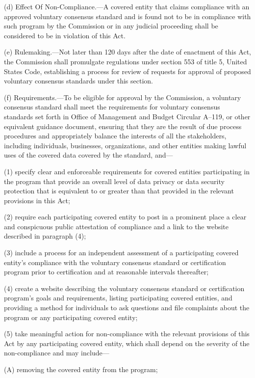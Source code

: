 (d) Effect Of Non-Compliance.—A covered entity that claims compliance with an approved voluntary consensus standard and is found not to be in compliance with such program by the Commission or in any judicial proceeding shall be considered to be in violation of this Act.

(e) Rulemaking.—Not later than 120 days after the date of enactment of this Act, the Commission shall promulgate regulations under section 553 of title 5, United States Code, establishing a process for review of requests for approval of proposed voluntary consensus standards under this section.

(f) Requirements.—To be eligible for approval by the Commission, a voluntary consensus standard shall meet the requirements for voluntary consensus standards set forth in Office of Management and Budget Circular A–119, or other equivalent guidance document, ensuring that they are the result of due process procedures and appropriately balance the interests of all the stakeholders, including individuals, businesses, organizations, and other entities making lawful uses of the covered data covered by the standard, and—

(1) specify clear and enforceable requirements for covered entities participating in the program that provide an overall level of data privacy or data security protection that is equivalent to or greater than that provided in the relevant provisions in this Act;

(2) require each participating covered entity to post in a prominent place a clear and conspicuous public attestation of compliance and a link to the website described in paragraph (4);

(3) include a process for an independent assessment of a participating covered entity’s compliance with the voluntary consensus standard or certification program prior to certification and at reasonable intervals thereafter;

(4) create a website describing the voluntary consensus standard or certification program’s goals and requirements, listing participating covered entities, and providing a method for individuals to ask questions and file complaints about the program or any participating covered entity;

(5) take meaningful action for non-compliance with the relevant provisions of this Act by any participating covered entity, which shall depend on the severity of the non-compliance and may include—

(A) removing the covered entity from the program;

